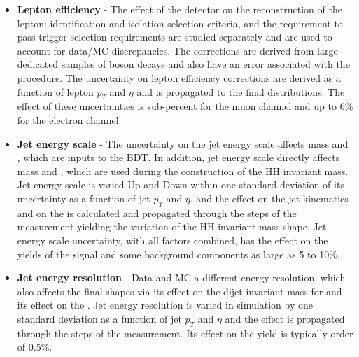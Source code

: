 \begin{itemize}

\item{\bfseries Lepton efficiency} - The effect of the detector on the reconstruction of the lepton: identification and isolation selection
  criteria, and the requirement to pass trigger selection requirements are studied separately and are used to account for data/MC discrepancies. The corrections are derived
  from large dedicated samples of \PZ boson decays and also have an error associated with the procedure. 
  The uncertainty on lepton efficiency corrections are derived
  as a function of lepton $p_T$ and $\eta$ and is propagated to the final \mTHH distributions.
  The effect of these uncertainties is sub-percent for the muon
  channel and up to 6\% for the electron channel.


\item{\bfseries Jet energy scale} - The uncertainty on the jet energy scale
  affects \HBB mass and \pt, which are inputs to the BDT. In addition, jet energy scale directly affects \HBB mass and \ETslash, which are used during the construction of the HH invariant mass. %
  Jet energy scale is varied Up and Down within one standard deviation of its uncertainty %
  as a function of jet $p_T$ and $\eta$, and the
  effect on the jet kinematics and on the \ETslash is calculated and
  propagated through the steps of the measurement yielding the
  variation of the HH invariant mass shape.  Jet energy scale
  uncertainty, with all factors combined, has the effect on the yields
  of the signal and some background components as large as 5 to 10\%.

\item{\bfseries Jet energy resolution} - Data and MC a different energy
  resolution, which also affects the final \mTHH shapes via its effect on the dijet invariant
  mass for \HBB and its effect on the \ETslash. Jet energy resolution
  is varied in simulation by one standard deviation as a function of
  jet $p_T$ and $\eta$ and the effect is propagated through the steps
  of the measurement. Its effect on the \mTHH yield is typically order of 0.5\%.


\end{itemize}
